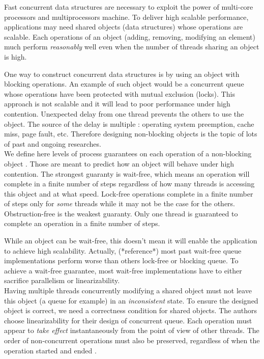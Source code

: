 Fast concurrent data structures are necessary to exploit the power of multi-core
processors and multiprocessors machine. To deliver high scalable performance,
applications may need shared objects (data structures) whose operations are
scalable. Each operations of an object (adding, removing, modifying an element)
much perform \textit{reasonably} well even when the number of threads sharing an
object is high.

One way to construct concurrent data structures is by using an object with
blocking operations. An example of such object would be a concurrent queue whose
operations have been protected with mutual exclusion (locks). This approach is
not scalable and it will lead to poor performance under high contention.
Unexpected delay from one thread prevents the others to use the object. The
source of the delay is multiple : operating system preemption, cache miss, page
fault, etc. Therefore designing non-blocking objects is the topic of lots of
past and ongoing researches. \\

 We define here levels of process guarantees
on each operation of a non-blocking object \cite{Yang:2016:WQF:3016078.2851168}.
Those are meant to predict how an object will behave under high contention. The
strongest guaranty is wait-free, which means an operation will complete in a
finite number of steps regardless of how many threads is accessing this object
and at what speed. Lock-free operations complete in a finite number of steps
only for \textit{some} threads while it may not be the case for the others.
Obstruction-free is the weakest guaranty. Only one thread is guaranteed to
complete an operation in a finite number of steps.

While an object can be wait-free, this doesn't mean it will enable the
application to achieve high scalability. Actually, (*reference*) most past
wait-free queue implementations perform worse than others lock-free or blocking
queue. To achieve a wait-free guarantee, most wait-free implementations have to
either sacrifice parallelism or linearizability. \\

 Having multiple threads concurrently modifying a shared
object must not leave this object (a queue for example) in an
\textit{inconsistent} state. To ensure the designed object is correct, we need a
correctness condition for shared objects. The authors choose linearizability for
their design of concurrent queue. Each operation must appear to \textit{take
effect} instantaneously from the point of view of other threads. The order of
non-concurrent operations must also be preserved, regardless of when the
operation started and ended \cite{Herlihy:1990:LCC:78969.78972}.

